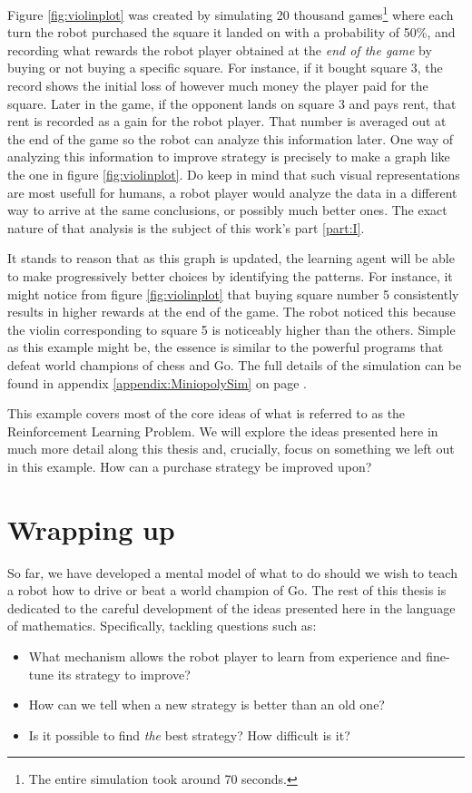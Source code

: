 Figure \ref{fig:violinplot} was created by simulating 20 thousand
games\footnote{The entire simulation took around 70 seconds.} where each turn
the robot purchased the square it landed on with a probability of 50\%, and
recording what rewards the robot player obtained at the \textit{end of the game}
by buying or not buying a specific square. For instance, if it bought square 3,
the record shows the initial loss of however much money the player paid for the
square.  Later in the game, if the opponent lands on square 3 and pays rent,
that rent is recorded as a gain for the robot player. That number is averaged
out at the end of the game so the robot can analyze this information later. One
way of analyzing this information to improve strategy is precisely to make a
graph like the one in figure \ref{fig:violinplot}. Do keep in mind that such
visual representations are most usefull for humans, a robot player would analyze
the data in a different way to arrive at the same conclusions, or possibly much
better ones.  The exact nature of that analysis is the subject of this work's
part \ref{part:I}.

It stands to reason that as this graph is updated, the learning agent will be
able to make progressively better choices by identifying the patterns. For
instance, it might notice from figure \ref{fig:violinplot} that buying square
number 5 consistently results in higher rewards at the end of the game. The
robot noticed this because the violin corresponding to square 5 is noticeably
higher than the others. Simple as this example might be, the essence is similar
to the powerful programs that defeat world champions of chess and Go. The full
details of the simulation can be found in appendix
\ref{appendix:MiniopolySim} on page
\pageref{appendix:MiniopolySim}.

This example covers most of the core ideas of what is referred to as the
Reinforcement Learning Problem. We will explore the ideas presented here in much
more detail along this thesis and, crucially, focus on something we left out in
this example. How can a purchase strategy be improved upon?

\section{Wrapping up}
So far, we have developed a mental model of what to do should we wish to teach a
robot how to drive or beat a world champion of Go. The rest of this thesis is
dedicated to the careful development of the ideas presented here in the language
of mathematics. Specifically, tackling questions such as:
\begin{itemize}
	\item What mechanism allows the robot player to learn from experience and
		fine-tune its strategy to improve?
	\item How can we tell when a new strategy is better than an old one?
	\item Is it possible to find \textit{the} best strategy?  How difficult is
		it?
\end{itemize}

